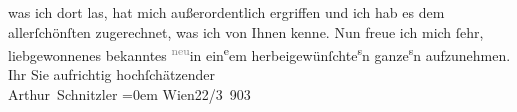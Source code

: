 \begin{ledgroupsized}[t]{13cm}
                    was ich dort las, hat mich außerordentlich ergriffen und ich hab es dem
                    allerſchönſten zugerechnet, was ich von Ihnen {\pb}kenne.
                    Nun freue ich mich ſehr, liebgewonnenes bekanntes \substVorne{}\textsuperscript{\textcolor{gray}{neu}}\substDazwischen{}in\substHinten{} ein\substVorne{}\textsuperscript{e}\substDazwischen{}em\substHinten{} herbeigewünſchte\substVorne{}\textsuperscript{s}\substDazwischen{}n\substHinten{} ganze\substVorne{}\textsuperscript{s}\substDazwischen{}n\substHinten{} aufzunehmen.\pend
           \pstart
           Ihr Sie aufrichtig hochſchätzender{\\[\baselineskip]}\spacefill\mbox{Arthur Schnitzler}\pend
           \leftskip=0em{}\pstart
           Wien22/3 903\pend
           
         
         \endnumbering{}\end{ledgroupsized}  \newcommand{\dateiname}{L01278}\newcommand{\titel}{Arthur Schnitzler an Richard Dehmel, 22. 3. 1903}\newcommand{\editorInnen}{ Martin Anton Müller und Gerd-Hermann Susen}
      